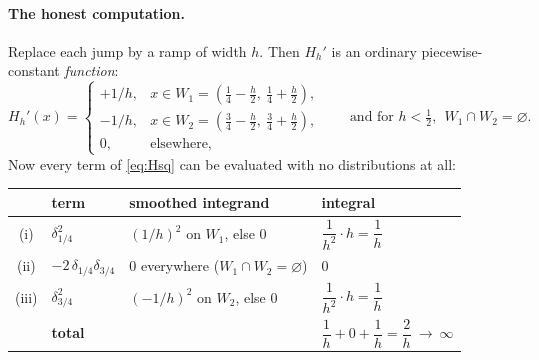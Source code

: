 
\paragraph{The honest computation.}
Replace each jump by a ramp of width $h$. Then $H_{h}'$ is an ordinary
piecewise-constant \emph{function}:
\begin{equation}\label{eq:Hh}
  H_{h}'(x)=\begin{cases}
    +1/h, & x\in W_{1}=\left(\tfrac14-\tfrac h2,\ \tfrac14+\tfrac h2\right),\\[3pt]
    -1/h, & x\in W_{2}=\left(\tfrac34-\tfrac h2,\ \tfrac34+\tfrac h2\right),\\[3pt]
    0,    & \text{elsewhere,}
  \end{cases}
  \qquad\text{and for } h<\tfrac12,\ \ W_{1}\cap W_{2}=\varnothing .
\end{equation}
Now every term of \eqref{eq:Hsq} can be evaluated with no distributions at all:
\begin{center}\small
\renewcommand{\arraystretch}{1.35}
\begin{tabular}{@{}clll@{}}
\toprule
 & \textbf{term} & \textbf{smoothed integrand} & \textbf{integral}\\
\midrule
(i)   & $\delta_{1/4}^{2}$              & $(1/h)^{2}$ on $W_{1}$, else $0$
      & $\dfrac{1}{h^{2}}\cdot h=\dfrac1h$\\
(ii)  & $-2\,\delta_{1/4}\delta_{3/4}$  & $0$ everywhere ($W_{1}\cap W_{2}=\varnothing$)
      & $0$\\
(iii) & $\delta_{3/4}^{2}$              & $(-1/h)^{2}$ on $W_{2}$, else $0$
      & $\dfrac{1}{h^{2}}\cdot h=\dfrac1h$\\
\midrule
      & \textbf{total} & &
        $\dfrac1h+0+\dfrac1h=\dfrac{2}{h}\ \longrightarrow\ \infty$\\
\bottomrule
\end{tabular}
\end{center}

